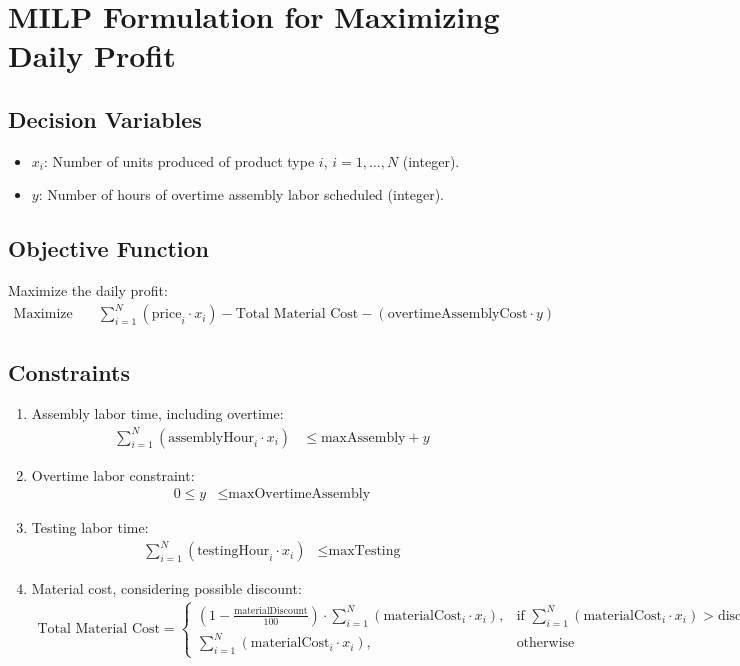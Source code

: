 \documentclass{article}
\begin{document}
\section*{MILP Formulation for Maximizing Daily Profit}

\subsection*{Decision Variables}
\begin{itemize}
    \item $x_i$: Number of units produced of product type $i$, $i=1,\ldots,N$ (integer).
    \item $y$: Number of hours of overtime assembly labor scheduled (integer).
\end{itemize}

\subsection*{Objective Function}
Maximize the daily profit:
\begin{align}
    \text{Maximize} \quad & \sum_{i=1}^{N} (\text{price}_i \cdot x_i) - \text{Total Material Cost} - (\text{overtimeAssemblyCost} \cdot y)
\end{align}

\subsection*{Constraints}
\begin{enumerate}
    \item Assembly labor time, including overtime:
    \begin{align}
        \sum_{i=1}^{N} (\text{assemblyHour}_i \cdot x_i) &\leq \text{maxAssembly} + y
    \end{align}
    \item Overtime labor constraint:
    \begin{align}
        0 \leq y &\leq \text{maxOvertimeAssembly}
    \end{align}
    \item Testing labor time:
    \begin{align}
        \sum_{i=1}^{N} (\text{testingHour}_i \cdot x_i) &\leq \text{maxTesting}
    \end{align}
    \item Material cost, considering possible discount:
    \begin{align}
        \text{Total Material Cost} = 
        \begin{cases} 
        \left(1 - \frac{\text{materialDiscount}}{100}\right) \cdot \sum_{i=1}^{N} (\text{materialCost}_i \cdot x_i), & \text{if } \sum_{i=1}^{N} (\text{materialCost}_i \cdot x_i) > \text{discountThreshold} \\ 
        \sum_{i=1}^{N} (\text{materialCost}_i \cdot x_i), & \text{otherwise} 
        \end{cases}
    \end{align}
\end{enumerate}
\end{document}
